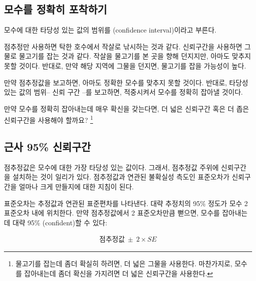 
\subsection{모수를 정확히 포착하기}

모수에 대한 타당성 있는 값의 범위를 (confidence interval)이라고 부른다.

점추정만 사용하면 탁한 호수에서 작살로 낚시하는 것과 같다. 신뢰구간을 사용하면 그물로 물고기를 잡는 것과 같다. 작살을 물고기를 본 곳을 향해 던지지만, 아마도 맞추지 못할 것이다. 반대로, 만약 해당 지역에 그물을 던지면, 물고기를 잡을 가능성이 높다.

만약 점추정값을 보고하면, 아마도 정확한 모수를 맞추지 못할 것이다. 반대로, 타당성 있는 값의 범위-- 신뢰 구간 --를 보고하면, 적중시켜서 모수를 정확히 잡아낼 것이다.

\begin{exercise}
만약 모수를 정확히 잡아내는데 매우 확신을 갖는다면, 더 넓은 신뢰구간 혹은 더 좁은 신뢰구간을 사용해야 할까요?
\footnote{물고기를 잡는데 좀더 확실히 하려면, 더 넓은 그물을 사용한다. 마찬가지로, 모수를 잡아내는데 좀더 확신을 가지려면 더 넓은 신뢰구간을 사용한다.}
\end{exercise}


\textC{\pagebreak}


\subsection{근사 95\% 신뢰구간}

점추정값은 모수에 대한 가장 타당성 있는 값이다. 그래서, 점추정값 주위에 신뢰구간을 설치하는 것이 일리가 있다. 점추정값과 연관된 불확실성 측도인 표준오차가 신뢰구간을 얼마나 크게 만들지에 대한 지침이 된다.

표준오차는 추정값과 연관된 표준편차를 나타낸다. 대략 추정치의 95\% 정도가 모수 2 표준오차 내에 위치한다. 만약 점추정값에서 2 표준오차만큼 뻗으면, 모수를 잡아내는데 대략 95\% (confident)할 수 있다:

\begin{eqnarray}
\text{점추정값}\ \pm\ 2\times SE
\label{95PercentConfidenceIntervalFormula}
\end{eqnarray}

